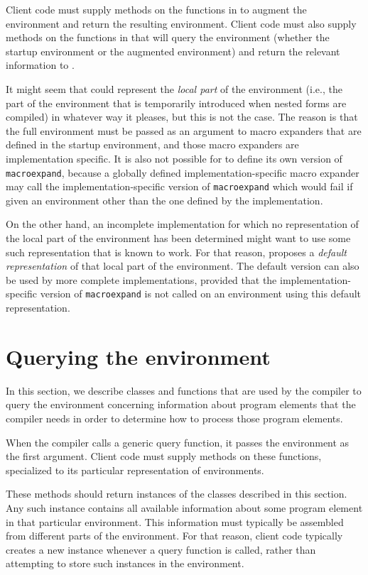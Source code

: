Client code must supply methods on the functions in
 to augment the environment and
return the resulting environment.  Client code must also supply
methods on the functions in  that
will query the environment (whether the startup environment or the
augmented environment) and return the relevant information to
\sysname{}. 

It might seem that \sysname{} could represent the \emph{local part} of
the environment (i.e., the part of the environment that is temporarily
introduced when nested forms are compiled) in whatever way it pleases,
but this is not the case.  The reason is that the full environment
must be passed as an argument to macro expanders that are defined in
the startup environment, and those macro expanders are implementation
specific.  It is also not possible for \sysname{} to define its own
version of \texttt{macroexpand}, because a globally defined
implementation-specific macro expander may call the
implementation-specific version of \texttt{macroexpand} which would
fail if given an environment other than the one defined by the
implementation. 

On the other hand, an incomplete implementation for which no
representation of the local part of the environment has been
determined might want to use some such representation that is known to
work.  For that reason, \sysname{} proposes a \emph{default
  representation} of that local part of the environment.  The default
version can also be used by more complete implementations, provided
that the implementation-specific version of \texttt{macroexpand} is
not called on an environment using this default representation. 

\section{Querying the environment}
\label{sec-environment-querying}

In this section, we describe classes and functions that are used by
the compiler to query the environment concerning information about
program elements that the compiler needs in order to determine how to
process those program elements. 

When the compiler calls a generic query function, it passes the
environment as the first argument.  Client code must supply methods
on these functions, specialized to its particular representation of
environments. 

These methods should return instances of the classes described in this
section.  Any such instance contains all available information about
some program element in that particular environment.  This information
must typically be assembled from different parts of the environment.
For that reason, client code typically creates a new instance whenever
a query function is called, rather than attempting to store such
instances in the environment. 

